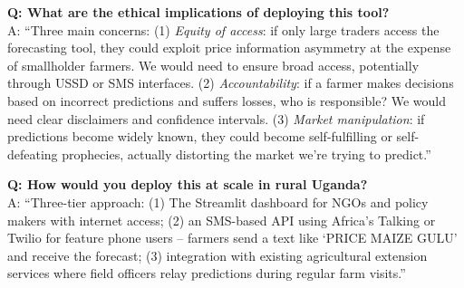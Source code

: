 \documentclass[11pt,a4paper]{article}
\begin{document}
\textbf{Q: What are the ethical implications of deploying this tool?}\\
A: ``Three main concerns: (1) \textit{Equity of access}: if only large traders access the forecasting tool, they could exploit price information asymmetry at the expense of smallholder farmers. We would need to ensure broad access, potentially through USSD or SMS interfaces. (2) \textit{Accountability}: if a farmer makes decisions based on incorrect predictions and suffers losses, who is responsible? We would need clear disclaimers and confidence intervals. (3) \textit{Market manipulation}: if predictions become widely known, they could become self-fulfilling or self-defeating prophecies, actually distorting the market we're trying to predict.''

\textbf{Q: How would you deploy this at scale in rural Uganda?}\\
A: ``Three-tier approach: (1) The Streamlit dashboard for NGOs and policy makers with internet access; (2) an SMS-based API using Africa's Talking or Twilio for feature phone users -- farmers send a text like `PRICE MAIZE GULU' and receive the forecast; (3) integration with existing agricultural extension services where field officers relay predictions during regular farm visits.''
\end{document}
